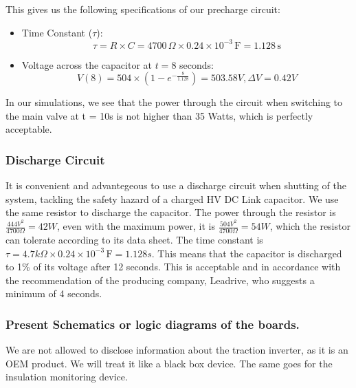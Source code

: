 This gives us the following specifications of our precharge circuit:
\begin{itemize}
\item Time Constant (\( \tau \)):
\[ \tau = R \times C = 4700 \, \Omega \times 0.24 \times 10^{-3} \, \text{F} = 1.128 \, \text{s} \]

\item Voltage across the capacitor at \( t = 8 \) seconds:
\[ V(8) = 504 \times \left(1 - e^{-\frac{8}{1.128}}\right) = 503.58V, \Delta V = 0.42V \]
\end{itemize}
In our simulations, we see that the power through the circuit when switching to the main valve at t = 10s is not higher than 35 Watts, which is perfectly acceptable.

\subsubsection*{Discharge Circuit}
It is convenient and advantegeous to use a discharge circuit when shutting of the system, tackling the safety hazard of a charged HV DC Link capacitor. We use the same resistor to discharge the capacitor. The power through the resistor is \( \frac{444V^2}{4700\Omega} = 42W \), even with the maximum power, it is \( \frac{504V^2}{4700\Omega} = 54W \), which the resistor can tolerate according to its data sheet. The time constant is \( \tau = 4.7k \Omega \times 0.24 \times 10^{-3} \, \text{F} = 1.128s \). This means that the capacitor is discharged to 1\% of its voltage after 12 seconds. This is acceptable and in accordance with the recommendation of the producing company, Leadrive, who suggests a minimum of 4 seconds.

\subsubsection{Present Schematics or logic diagrams of the boards.}

We are not allowed to disclose information about the traction inverter, as it is an OEM product. We will treat it like a black box device. 
The same goes for the insulation monitoring device.
